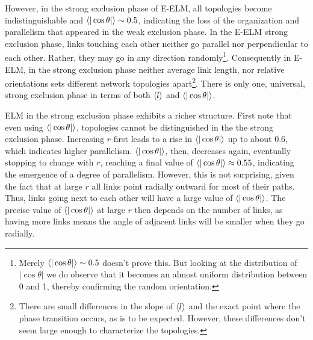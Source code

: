 \documentclass[nofootinbib,preprint,floatfix,endfloats]{revtex4} %
\begin{document}
However, in the strong exclusion phase of E-ELM, all topologies become indistinguishable and $\be{|\cos\theta|} \sim 0.5 $, indicating the loss of the organization and parallelism that appeared in the weak exclusion phase. 
In the E-ELM strong exclusion phase, links touching each other neither go parallel nor perpendicular to each other.
Rather, they may go in any direction randomly\footnote{Merely  $\be{|\cos\theta|} \sim 0.5 $ doesn't prove this. But looking at the distribution of $|\cos\theta|$ we do observe that it becomes an almost uniform distribution between 0 and 1, thereby confirming the random orientation.}. 
Consequently in E-ELM, %
in the strong exclusion phase %
neither average link length, nor relative orientations sets different network topologies apart\footnote{
There are small differences in the slope of $\left<l\right>$ and the exact point where the phase transition occurs, as is to be expected.
However, these differences don't seem large enough to characterize the topologies.}. 
There is only one, universal, strong exclusion phase in terms of both $\left<l\right>$ and $\be{|\cos\theta|}$. 

ELM in the strong exclusion phase exhibits a richer structure. 
First note that even using $\be{|\cos\theta|} $, topologies cannot be distinguished in the the strong exclusion phase. 
Increasing $r$ first leads to a rise in $\be{|\cos\theta|} $ up to about $0.6$, which indicates higher parallelism. 
$\be{|\cos\theta|}$, then, decreases again, eventually stopping to change with $r$, reaching a final value of $\be{|\cos\theta|} \approx 0.55 $, indicating the emergence of a degree of parallelism. 
However, this is not surprising, given the fact that at large $r$ all links point radially outward for most of their paths. Thus, links going next to each other will have a large value of  $\be{|\cos\theta|}$. The precise value of $\be{|\cos\theta|}$ at large $r$ then depends on the number of links, as having more links means the angle of adjacent links will be smaller when they go radially. 
\end{document}
